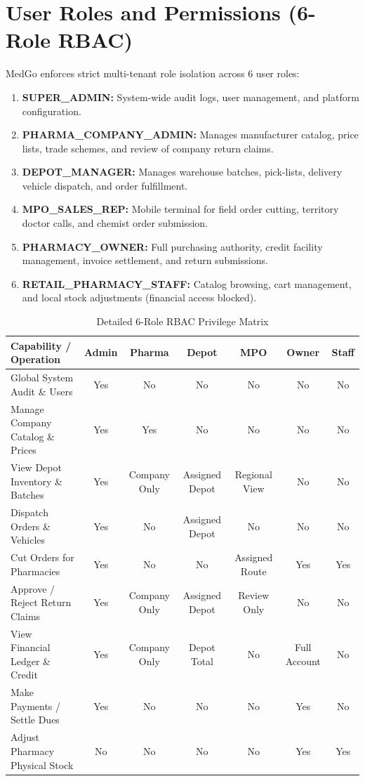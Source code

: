 \documentclass[10pt,a4paper]{article}
\begin{document}
\section{User Roles and Permissions (6-Role RBAC)}
MedGo enforces strict multi-tenant role isolation across 6 user roles:
\begin{enumerate}[leftmargin=*]
    \item \textbf{SUPER\_ADMIN:} System-wide audit logs, user management, and platform configuration.
    \item \textbf{PHARMA\_COMPANY\_ADMIN:} Manages manufacturer catalog, price lists, trade schemes, and review of company return claims.
    \item \textbf{DEPOT\_MANAGER:} Manages warehouse batches, pick-lists, delivery vehicle dispatch, and order fulfillment.
    \item \textbf{MPO\_SALES\_REP:} Mobile terminal for field order cutting, territory doctor calls, and chemist order submission.
    \item \textbf{PHARMACY\_OWNER:} Full purchasing authority, credit facility management, invoice settlement, and return submissions.
    \item \textbf{RETAIL\_PHARMACY\_STAFF:} Catalog browsing, cart management, and local stock adjustments (financial access blocked).
\end{enumerate}

\begin{table}[h!]
\centering
\small
\begin{tabularx}{\textwidth}{p{4.5cm}cccccc}
\toprule
\textbf{Capability / Operation} & \textbf{Admin} & \textbf{Pharma} & \textbf{Depot} & \textbf{MPO} & \textbf{Owner} & \textbf{Staff} \\
\midrule
Global System Audit \& Users & Yes & No & No & No & No & No \\
Manage Company Catalog \& Prices & Yes & Yes & No & No & No & No \\
View Depot Inventory \& Batches & Yes & Company Only & Assigned Depot & Regional View & No & No \\
Dispatch Orders \& Vehicles & Yes & No & Assigned Depot & No & No & No \\
Cut Orders for Pharmacies & Yes & No & No & Assigned Route & Yes & Yes \\
Approve / Reject Return Claims & Yes & Company Only & Assigned Depot & Review Only & No & No \\
View Financial Ledger \& Credit & Yes & Company Only & Depot Total & No & Full Account & No \\
Make Payments / Settle Dues & Yes & No & No & No & Yes & No \\
Adjust Pharmacy Physical Stock & No & No & No & No & Yes & Yes \\
\bottomrule
\end{tabularx}
\caption{Detailed 6-Role RBAC Privilege Matrix}
\end{table}
\end{document}
